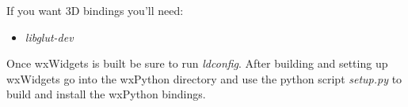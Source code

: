 \documentclass[12pt]{article}
\begin{document}
    If you want 3D bindings you'll need: 

\begin{itemize}
   \item {\it libglut-dev}
\end{itemize}

Once wxWidgets is built be sure to run {\it ldconfig}. After building and setting up wxWidgets go into the wxPython directory and use the python script {\it setup.py} to build and install the wxPython bindings.
\end{document}
